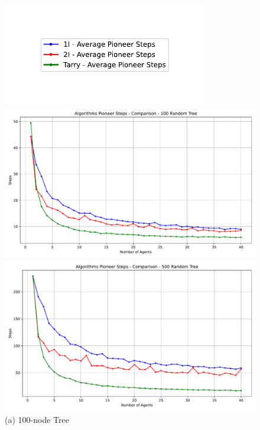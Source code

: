 \begin{figure}[H]
    \centering
    \includegraphics[width=0.8\textwidth]{Cap3/no_comm_steps_legend.pdf}
    \vspace{1em}
    \begin{minipage}[b]{0.45\textwidth}
        \centering
        \includegraphics[width=\textwidth]{Cap3/no_comm_steps__100_tree.pdf}
        \caption{(a) 100-node Tree}
        \label{fig_no_comm_steps_100_tree}
    \end{minipage}
    \hfill
    \begin{minipage}[b]{0.45\textwidth}
        \centering
        \includegraphics[width=\textwidth]{Cap3/no_comm_steps__500_tree.pdf}

\end{minipage}
\end{figure}
